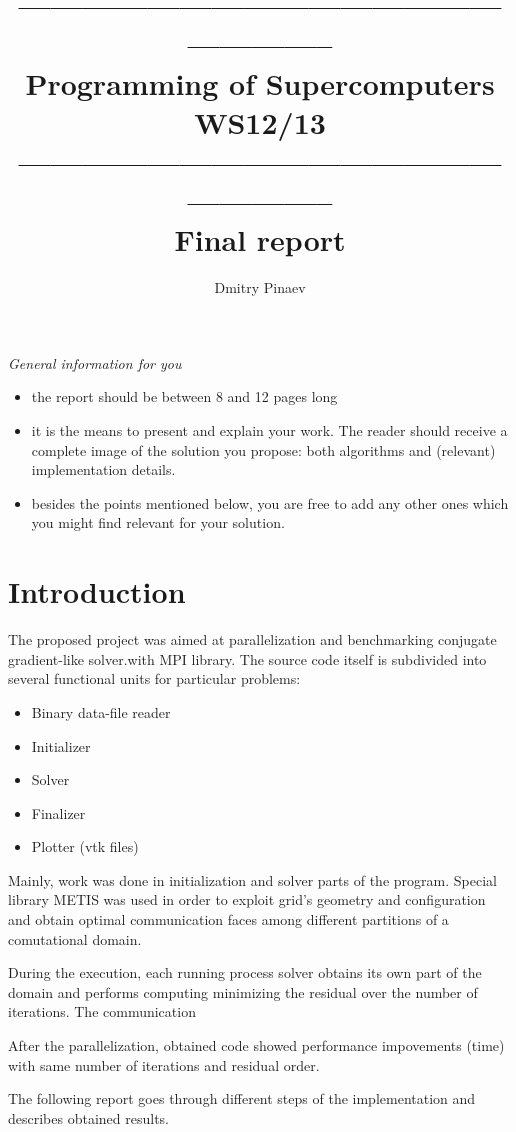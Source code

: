 \documentclass[12pt, a4paper]{article}
\title{----------------------------------------------------------- \\
        {\bf Programming of Supercomputers WS12/13}\\ 
        ----------------------------------------------------------- \\ 
        Final report}
\author{Dmitry Pinaev}
\date{ }
\newcommand{\hint}[1]{\textcolor{OliveGreen}{{\it#1}}}
\begin{document}
  \maketitle

\hint{General information for you
\begin{itemize}
	\item the report should be between 8 and 12 pages long
	\item it is the means to present and explain your work. 
	The reader should receive a complete image of the solution you propose: 
	both algorithms and  (relevant) implementation details.
	\item besides the points mentioned below, you are free to add any other ones which you might find relevant for your solution.
\end{itemize}}



\section{Introduction}

The proposed project was aimed at parallelization and benchmarking conjugate gradient-like solver.with MPI library.
The source code itself is subdivided into several functional units for particular problems:
\begin{itemize}
	\item Binary data-file reader
	\item Initializer
	\item Solver
	\item Finalizer
	\item Plotter (vtk files)
\end{itemize}

Mainly, work was done in initialization and solver parts of the program. Special library METIS was used in order
to exploit grid's geometry and configuration and obtain optimal communication faces among different
partitions of a comutational domain.

During the execution, each running process solver obtains its own part of the domain and performs
computing minimizing the residual over the number of iterations.
The communication 

After the parallelization, obtained code showed performance impovements (time) with
same number of iterations and residual order.

The following report goes through different steps of the implementation
and describes obtained results.
\end{document}
